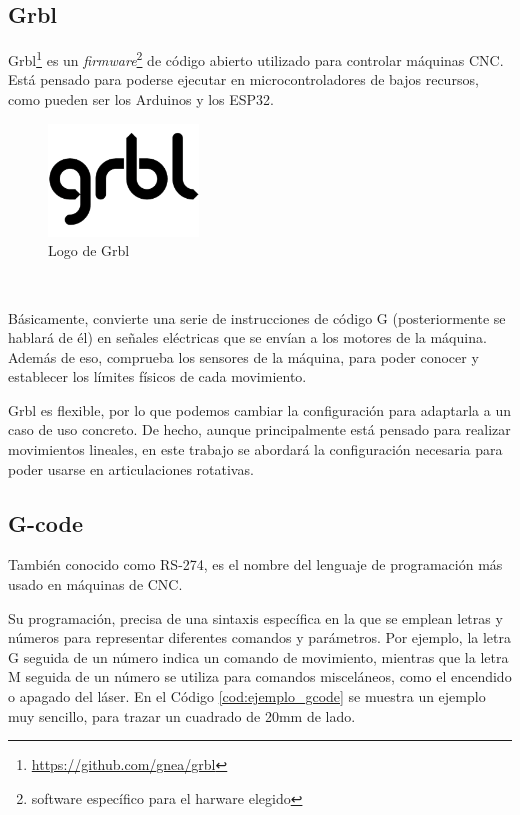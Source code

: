 \subsection{Grbl}
\label{subsec:grbl}
\noindent Grbl\footnote{\url{https://github.com/gnea/grbl}} es un \textit{firmware}\footnote{software específico para el harware elegido} de código abierto utilizado para controlar máquinas \acs{CNC}. 
Está pensado para poderse ejecutar en microcontroladores de bajos recursos, como pueden ser los Arduinos y los ESP32.
\begin{figure} [h!]
  \begin{center}
    \includegraphics[width=4cm]{figs/grbl.png}
  \end{center}
  \caption{Logo de Grbl}
  \label{fig:grbllogo}
\end{figure}\ 


Básicamente, convierte una serie de instrucciones de código G (posteriormente se hablará de él) en señales eléctricas que se envían a 
los motores de la máquina. Además de eso, comprueba los sensores de la máquina, para poder conocer y establecer los límites físicos de cada movimiento. 

Grbl es flexible, por lo que podemos cambiar la configuración para adaptarla a un caso de uso concreto. De hecho, aunque principalmente está pensado para realizar 
movimientos lineales, en este trabajo se abordará la configuración necesaria para poder usarse en articulaciones rotativas.

\subsection{G-code}
\label{sec:gcode}
\noindent También conocido como RS-274, es el nombre del lenguaje de programación más usado en máquinas de \ac{CNC}. 

Su programación, precisa de una sintaxis específica en la que se emplean letras y números para representar 
diferentes comandos y parámetros. Por ejemplo, la letra G seguida de un número indica un comando de movimiento, mientras 
que la letra M seguida de un número se utiliza para comandos misceláneos, como el encendido o apagado del láser.
En el Código \ref{cod:ejemplo_gcode} se muestra un ejemplo muy sencillo, para trazar un cuadrado de 20mm de lado.

